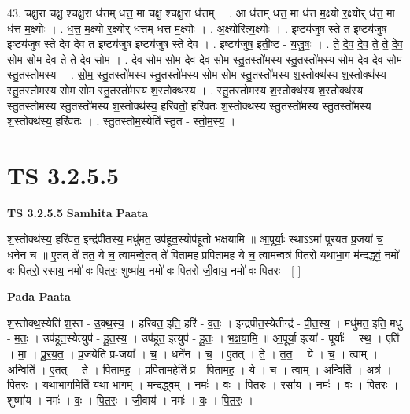 \documentclass[17pt]{extarticle}
\begin{document}
43. चक्षु॒रा चक्षु॒ श्चक्षु॒रा ध॑त्तम् धत्त॒ मा चक्षु॒ श्चक्षु॒रा ध॑त्तम् । . आ ध॑त्तम् धत्त॒ मा ध॑त्त म॒क्ष्यो र॒क्ष्योर् ध॑त्त॒ मा ध॑त्त म॒क्ष्योः । . ध॒त्त॒ म॒क्ष्यो र॒क्ष्योर् ध॑त्तम् धत्त म॒क्ष्योः । . अ॒क्ष्योरित्य॒क्ष्योः । . इ॒ष्टय॑जुष स्ते त इ॒ष्टय॑जुष इ॒ष्टय॑जुष स्ते देव देव त इ॒ष्टय॑जुष इ॒ष्टय॑जुष स्ते देव । . इ॒ष्टय॑जुष॒ इती॒ष्ट - य॒जु॒षः॒ । . ते॒ दे॒व॒ दे॒व॒ ते॒ ते॒ दे॒व॒ सो॒म॒ सो॒म॒ दे॒व॒ ते॒ ते॒ दे॒व॒ सो॒म॒ । . दे॒व॒ सो॒म॒ सो॒म॒ दे॒व॒ दे॒व॒ सो॒म॒ स्तु॒तस्तो॑मस्य स्तु॒तस्तो॑मस्य सोम देव देव सोम स्तु॒तस्तो॑मस्य । . सो॒म॒ स्तु॒तस्तो॑मस्य स्तु॒तस्तो॑मस्य सोम सोम स्तु॒तस्तो॑मस्य श॒स्तोक्थ॑स्य श॒स्तोक्थ॑स्य स्तु॒तस्तो॑मस्य सोम सोम स्तु॒तस्तो॑मस्य श॒स्तोक्थ॑स्य । . स्तु॒तस्तो॑मस्य श॒स्तोक्थ॑स्य श॒स्तोक्थ॑स्य स्तु॒तस्तो॑मस्य स्तु॒तस्तो॑मस्य श॒स्तोक्थ॑स्य॒ हरि॑वतो॒ हरि॑वतः श॒स्तोक्थ॑स्य स्तु॒तस्तो॑मस्य स्तु॒तस्तो॑मस्य श॒स्तोक्थ॑स्य॒ हरि॑वतः । . स्तु॒तस्तो॑म॒स्येति॑ स्तु॒त - स्तो॒म॒स्य॒ । \newline
\pagebreak
{}

\section{ TS 3.2.5.5 }

\textbf{TS 3.2.5.5 } \newline
\textbf{Samhita Paata} \newline

श॒स्तोक्थ॑स्य॒ हरि॑वत॒ इन्द्र॑पीतस्य॒ मधु॑मत॒ उप॑हूत॒स्योप॑हूतो भक्षयामि ॥ आ॒पूर्याः॒ स्थाऽऽमा॑ पूरयत प्र॒जया॑ च॒ धने॑न च ॥ ए॒तत् ते॑ तत॒ ये च॒ त्वामन्वे॒तत् ते॑ पितामह प्रपितामह॒ ये च॒ त्वामन्वत्र॑ पितरो यथाभा॒गं म॑न्दद्ध्वं॒ नमो॑ वः पितरो॒ रसा॑य॒ नमो॑ वः पितरः॒ शुष्मा॑य॒ नमो॑ वः पितरो जी॒वाय॒ नमो॑ वः पितरः - [  ] \newline

\textbf{Pada Paata} \newline

श॒स्तोक्थ॒स्येति॑ श॒स्त - उ॒क्थ॒स्य॒ । हरि॑वत॒ इति॒ हरि॑ - व॒तः॒ । इन्द्र॑पीत॒स्येतीन्द्र॑ - पी॒त॒स्य॒ । मधु॑मत॒ इति॒ मधु॑ - म॒तः॒ । उप॑हूत॒स्येत्युप॑ - हू॒त॒स्य॒ । उप॑हूत॒ इत्युप॑ - हू॒तः॒ । भ॒क्ष॒या॒मि॒ ॥ आ॒पूर्या॒ इत्या᳚ - पूर्याः᳚ । स्थ॒ । एति॑ । मा॒ । पू॒र॒य॒त॒ । प्र॒जयेति॑ प्र-जया᳚ । च॒ । धने॑न । च॒ ॥ ए॒तत् । ते॒ । त॒त॒ । ये । च॒ । त्वाम् । अन्विति॑ । ए॒तत् । ते॒ । पि॒ता॒म॒ह॒ । प्र॒पि॒ता॒म॒हेति॑ प्र - पि॒ता॒म॒ह॒ । ये । च॒ । त्वाम् । अन्विति॑ । अत्र॑ । पि॒त॒रः॒ । य॒था॒भा॒गमिति॑ यथा-भा॒गम् । म॒न्द॒द्ध्व॒म् । नमः॑ । वः॒ । पि॒त॒रः॒ । रसा॑य । नमः॑ । वः॒ । पि॒त॒रः॒ । शुष्मा॑य । नमः॑ । वः॒ । पि॒त॒रः॒ । जी॒वाय॑ । नमः॑ । वः॒ । पि॒त॒रः॒ ।  \newline
\end{document}
